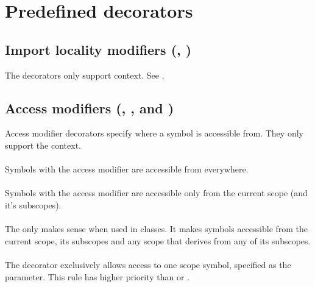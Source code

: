 \section{Predefined decorators}

\subsection{Import locality modifiers (, )}
The decorators only support  context. See .

\subsection{Access modifiers (, ,  and )} \label{accessModifierDecorators}
Access modifier decorators specify where a symbol is accessible from. They only support the  context.

\paragraph{} \label{decorator:public} Symbols with the  access modifier are accessible from everywhere.

\paragraph{} \label{decorator:private} Symbols with the  access modifier are accessible only from the current scope (and it's subscopes).

\paragraph{} \label{decorator:protected} The  only makes sense when used in classes. It makes symbols accessible from the current scope, its subscopes and any scope that derives from any of its subscopes.

\paragraph{} \label{decorator:friend} The  decorator exclusively allows access to one scope symbol, specified as the parameter. This rule has higher priority than  or .

